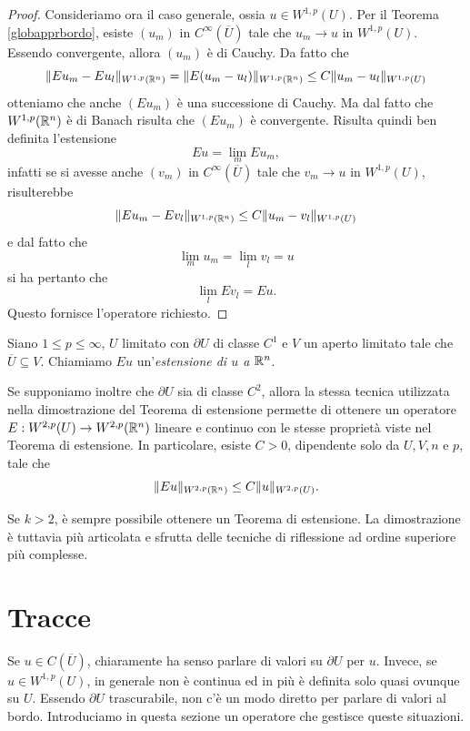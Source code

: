 \begin{proof}
	Consideriamo ora il caso generale, ossia $u \in W^{1,p}(U)$. Per il Teorema \eqref{globapprbordo}, esiste $(u_m)$ in $C^\infty(\overline{U})$ tale che $u_m \to u$ in $W^{1,p}(U)$. Essendo convergente, allora $(u_m)$ è di Cauchy. Da fatto che 
	\[ \lVert Eu_m- Eu_l\rVert_{W^{1,p}(\mathbb{R}^n)} = \lVert E(u_m- u_l)\rVert_{W^{1,p}(\mathbb{R}^n)} \le C \lVert u_m - u_l\rVert_{W^{1,p}(U)} \]
	otteniamo che  anche $(Eu_m)$ è una successione di Cauchy. Ma dal fatto che $W^{1,p}(\mathbb{R}^n)$ è di Banach risulta che $(Eu_m)$ è convergente. Risulta quindi ben definita l'estensione
	\[ Eu = \lim\limits_{m} Eu_m, \]
	infatti se si avesse anche $(v_m)$ in $C^\infty(\overline{U})$ tale che $v_m \to u$ in $W^{1,p}(U)$, risulterebbe
	\[ \lVert Eu_m- Ev_l\rVert_{W^{1,p}(\mathbb{R}^n)} \le C \lVert u_m - v_l\rVert_{W^{1,p}(U)} \]
	e dal fatto che 
	\[ \lim\limits_{m} u_m  = \lim\limits_{l} v_l = u\]
	si ha pertanto che 
	\[ \lim\limits_{l} Ev_l = Eu. \]
	Questo fornisce l'operatore richiesto. 
\end{proof}

\begin{definizione}
	Siano $1 \le p \le \infty$, $U$ limitato con $\partial U$ di classe $C^1$ e $V$ un aperto limitato tale che $\overline{U} \subseteq V$. Chiamiamo $Eu$ un'\emph{estensione di $u$ a $\mathbb{R}^n$}.
\end{definizione}
\begin{osservazione}
	Se supponiamo inoltre che $\partial U$ sia di classe $C^2$, allora la stessa tecnica utilizzata nella dimostrazione del Teorema di estensione permette di ottenere un operatore $E: W^{2,p}(U) \to W^{2,p}(\mathbb{R}^n)$ lineare e continuo con le stesse proprietà viste nel Teorema di estensione. In particolare, esiste $C > 0$, dipendente solo da $U,V,n$ e $p$, tale che 
	\[ \lVert Eu\rVert_{W^{2,p}(\mathbb{R}^n)}\le C\lVert u\rVert_{W^{2,p}(U)}.  \] 
\end{osservazione}
\begin{osservazione}
	Se $k > 2$, è sempre possibile ottenere un Teorema di estensione. La dimostrazione è tuttavia più articolata e sfrutta delle tecniche di riflessione ad ordine superiore più complesse.
\end{osservazione}

\section{Tracce}
Se $u \in C(\overline{U})$, chiaramente ha senso parlare di valori su $\partial U$ per $u$. Invece, se $u \in W^{1,p}(U)$, in generale non è continua ed in più è definita solo quasi ovunque su $U$. Essendo $\partial U$ trascurabile, non c'è un modo diretto per parlare di valori al bordo. Introduciamo in questa sezione un operatore che gestisce queste situazioni.

